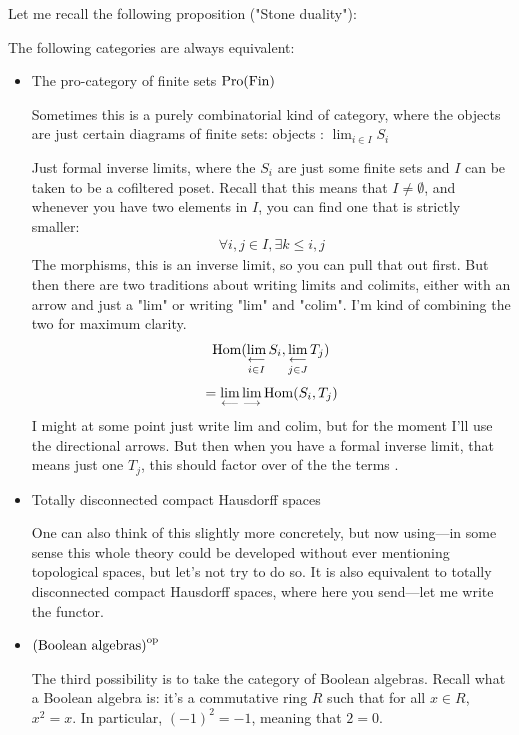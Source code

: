 \begin{proposition}
Let me recall the following proposition ("Stone duality"):

The following categories are always equivalent: 
\begin{itemize}
\item The pro-category of finite sets $\operatorname{Pro}(\operatorname{Fin})$

Sometimes this is a purely combinatorial kind of category, where the objects are just certain diagrams of finite sets:
objects : $\lim_{i \in I} S_i $

Just formal inverse limits, where the $S_i$ are just some finite sets and $I$ can be taken to be a cofiltered poset. Recall that this means that $I \neq \emptyset$, and whenever you have two elements in $I$, you can find one that is strictly smaller:
\begin{align*}
\forall i, j \in I, \exists k \leq i,j
\end{align*}
The morphisms, this is an inverse limit, so you can pull that out first. But then there are two traditions about writing limits and colimits, either with an arrow and just a "lim" or writing "lim" and "colim". I'm kind of combining the two for maximum clarity. 
\begin{align*}
\operatorname{Hom}(\mathop{\operatorname*{lim}\limits_{\longleftarrow}}\limits_{i \in I} S_i ,\mathop{\operatorname*{lim}\limits_{\longleftarrow}}\limits_{j \in J} T_j )
\end{align*}
\begin{align*}
 = \mathop{\operatorname*{lim}\limits_{\longleftarrow}}\limits \mathop{\operatorname*{lim}\limits_{\longrightarrow}}\limits \operatorname{Hom} (S_i, T_j)
\end{align*}
I might at some point just write lim and colim, but for the moment I'll use the directional arrows. But then when you have a formal inverse limit, that means just  one $T_j$, this should factor over of the the terms .

\item Totally disconnected compact Hausdorff spaces

One can also think of this slightly more concretely, but now using---in some sense this whole theory could be developed without ever mentioning topological spaces, but let's not try to do so. It is also equivalent to totally disconnected compact Hausdorff spaces, where here you send---let me write the functor. 

\item $\text{(Boolean algebras)}^{\mathrm{op}}$ 

The third possibility is to take the category of Boolean algebras. Recall what a Boolean algebra is: it's a commutative ring $R$ such that for all $x \in R$, $x^2 = x$. In particular, $(-1)^2 = -1$, meaning that $2 = 0$. 
\end{itemize}

\end{proposition}

